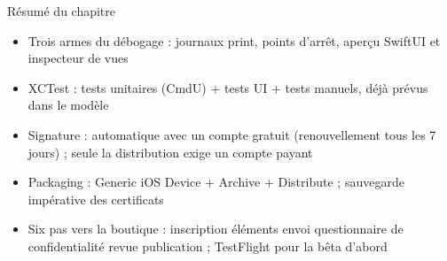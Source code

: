 \begin{tcbsummary}{Résumé du chapitre}
\begin{itemize}
  \item Trois armes du débogage : journaux print, points d'arrêt, aperçu SwiftUI et inspecteur de vues
  \item XCTest : tests unitaires (CmdU) + tests UI + tests manuels, déjà prévus dans le modèle
  \item Signature : automatique avec un compte gratuit (renouvellement tous les 7 jours) ; seule la distribution exige un compte payant
  \item Packaging : Generic iOS Device + Archive + Distribute ; sauvegarde impérative des certificats
  \item Six pas vers la boutique : inscription éléments envoi questionnaire de confidentialité revue publication ; TestFlight pour la bêta d'abord
\end{itemize}

\end{tcbsummary}
